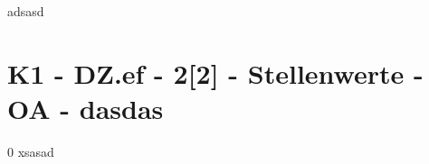 adsasd
\section{K1 - DZ.ef - 2[2] - Stellenwerte - OA - dasdas}

\begin{langesbeispiel}\item[0] %
xsasad

\end{langesbeispiel}
